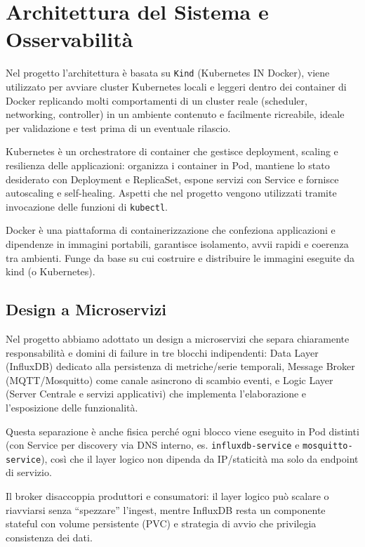 
\chapter{Architettura del Sistema e Osservabilità}
\label{cap:architettura_osservabilita}

Nel progetto l'architettura è basata su \texttt{Kind} (Kubernetes IN Docker), viene utilizzato per avviare cluster Kubernetes locali e leggeri dentro dei container di Docker replicando molti comportamenti di un cluster reale (scheduler, networking, controller) in un ambiente contenuto e facilmente ricreabile, ideale per validazione e test prima di un eventuale rilascio.

Kubernetes è un orchestratore di container che gestisce deployment, scaling e resilienza delle applicazioni: organizza i container in Pod, mantiene lo stato desiderato con Deployment e ReplicaSet, espone servizi con Service e fornisce autoscaling e self-healing.
Aspetti che nel progetto vengono utilizzati tramite invocazione delle funzioni di \texttt{kubectl}.

Docker è una piattaforma di containerizzazione che confeziona applicazioni e dipendenze in immagini portabili, garantisce isolamento, avvii rapidi e coerenza tra ambienti.
Funge da base su cui costruire e distribuire le immagini eseguite da kind (o Kubernetes).

\section{Design a Microservizi}
\label{sec:design_microservizi}
Nel progetto abbiamo adottato un design a microservizi che separa chiaramente responsabilità e domini di failure in tre blocchi indipendenti: Data Layer (InfluxDB) dedicato alla persistenza di metriche/serie temporali, Message Broker (MQTT/Mosquitto) come canale asincrono di scambio eventi, e Logic Layer (Server Centrale e servizi applicativi) che implementa l’elaborazione e l’esposizione delle funzionalità.

Questa separazione è anche fisica perché ogni blocco viene eseguito in Pod distinti (con Service per discovery via DNS interno, es. \texttt{influxdb-service} e \texttt{mosquitto-service}), così che il layer logico non dipenda da IP/staticità ma solo da endpoint di servizio.

Il broker disaccoppia produttori e consumatori: il layer logico può scalare o riavviarsi senza “spezzare” l’ingest, mentre InfluxDB resta un componente stateful con volume persistente (PVC) e strategia di avvio che privilegia consistenza dei dati.

